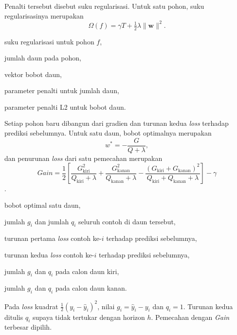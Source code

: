 Penalti tersebut disebut suku regularisasi. Untuk satu pohon, suku
regularisasinya merupakan
\begin{equation}
  \Omega(f) = \gamma T + \tfrac{1}{2}\lambda \lVert \mathbf{w} \rVert^2 .
  \label{eq:xgbreg}
\end{equation}
\begin{keterangan}
  \item[$\Omega(f)$] suku regularisasi untuk pohon $f$,
  \item[$T$] jumlah daun pada pohon,
  \item[$\mathbf{w}$] vektor bobot daun,
  \item[$\gamma$] parameter penalti untuk jumlah daun,
  \item[$\lambda$] parameter penalti L2 untuk bobot daun.
\end{keterangan}
Setiap pohon baru dibangun dari gradien dan turunan kedua \textit{loss}
terhadap prediksi sebelumnya. Untuk satu daun, bobot optimalnya merupakan
\begin{equation}
  w^{*} = -\frac{G}{Q + \lambda},
  \label{eq:xgbbobot}
\end{equation}
dan penurunan \textit{loss} dari satu pemecahan merupakan
\begin{equation}
  \textit{Gain} = \frac{1}{2}\left[
    \frac{G_{\text{kiri}}^2}{Q_{\text{kiri}} + \lambda}
  + \frac{G_{\text{kanan}}^2}{Q_{\text{kanan}} + \lambda}
  - \frac{(G_{\text{kiri}} + G_{\text{kanan}})^2}
         {Q_{\text{kiri}} + Q_{\text{kanan}} + \lambda}
  \right] - \gamma
  \label{eq:xgbgain}
\end{equation}
\cite{chen2016}.
\begin{keterangan}
  \item[$w^{*}$] bobot optimal satu daun,
  \item[$G$, $Q$] jumlah $g_i$ dan jumlah $q_i$ seluruh contoh di daun
    tersebut,
  \item[$g_i$] turunan pertama \textit{loss} contoh ke-$i$ terhadap prediksi
    sebelumnya,
  \item[$q_i$] turunan kedua \textit{loss} contoh ke-$i$ terhadap prediksi
    sebelumnya,
  \item[$G_{\text{kiri}}$, $Q_{\text{kiri}}$] jumlah $g_i$ dan $q_i$ pada calon
    daun kiri,
  \item[$G_{\text{kanan}}$, $Q_{\text{kanan}}$] jumlah $g_i$ dan $q_i$ pada
    calon daun kanan.
\end{keterangan}
Pada \textit{loss} kuadrat $\frac{1}{2}(y_i - \hat{y}_i)^2$, nilai
$g_i = \hat{y}_i - y_i$ dan $q_i = 1$. Turunan kedua ditulis $q_i$ supaya tidak
tertukar dengan horizon $h$. Pemecahan dengan \textit{Gain}
terbesar dipilih.

